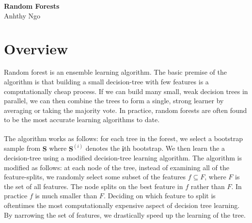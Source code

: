 \documentclass[12pt]{article}
\begin{document}
\begin{center}
    \Large \textbf{Random Forests} \\
    \small Anhthy Ngo
\end{center}

\section{Overview}
Random forest is an ensemble learning algorithm. The basic premise of the algorithm is that building a small decision-tree with few features is a computationally cheap process. If we can build many small, weak decision trees in parallel, we can then combine the trees to form a single, strong learner by averaging or taking the majority vote. In practice, random forests are often found to be the most accurate learning algorithms to date. \\\\
The algorithm works as follows: for each tree in the forest, we select a bootstrap sample from $\mathbf{S}$ where $\mathbf{S}^{(i)}$ denotes the $\mathbf{i}$th bootstrap. We then learn the a decision-tree using a modified decision-tree learning algorithm. The algorithm is modified as follows: at each node of the tree, instead of examining all of the feature-splits, we randomly select some subset of the features $f \subseteq F$, where $F$ is the set of all features. The node splits on the best feature in $f$ rather than $F$. In practice $f$ is much smaller than $F$. Deciding on which feature to split is oftentimes the most computationally expensive aspect of decision tree learning. By narrowing the set of features, we drastically speed up the learning of the tree.
\end{document}
